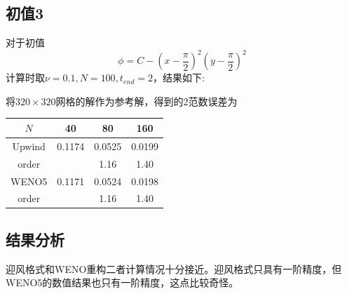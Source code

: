 \documentclass[a4paper,  11pt]{ctexart}
\begin{document}
\subsection{初值3}
对于初值
\[
\phi=C-\left(x-\frac{\pi}{2}\right)^2\left(y-\frac{\pi}{2}\right)^2
\]
计算时取$\nu=0.1,N=100,t_{end}=2$，结果如下:
\begin{figure}[H]
\end{figure}
将$320\times 320$网格的解作为参考解，得到的2范数误差为
\begin{table}[H]
  \centering
  \begin{tabular}{cccc}
    $N$ & 40 & 80 & 160 \\
    \hline
    Upwind &0.1174&0.0525&0.0199 \\
    order& & 1.16 &1.40 \\
    WENO5 & 0.1171 &0.0524&0.0198 \\
    order& & 1.16&1.40 \\
  \end{tabular}
\end{table}
\subsection{结果分析}
迎风格式和WENO重构二者计算情况十分接近。迎风格式只具有一阶精度，但
WENO5的数值结果也只有一阶精度，这点比较奇怪。
\end{document}
